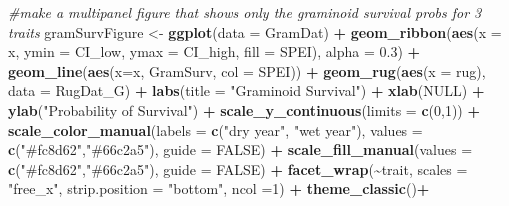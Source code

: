 \documentclass[
]{article}
\newenvironment{Shaded}{\begin{snugshade}}{\end{snugshade}}
\newcommand{\CommentTok}[1]{\textcolor[rgb]{0.56,0.35,0.01}{\textit{#1}}}
\newcommand{\DataTypeTok}[1]{\textcolor[rgb]{0.13,0.29,0.53}{#1}}
\newcommand{\DecValTok}[1]{\textcolor[rgb]{0.00,0.00,0.81}{#1}}
\newcommand{\FloatTok}[1]{\textcolor[rgb]{0.00,0.00,0.81}{#1}}
\newcommand{\KeywordTok}[1]{\textcolor[rgb]{0.13,0.29,0.53}{\textbf{#1}}}
\newcommand{\NormalTok}[1]{#1}
\newcommand{\OperatorTok}[1]{\textcolor[rgb]{0.81,0.36,0.00}{\textbf{#1}}}
\newcommand{\OtherTok}[1]{\textcolor[rgb]{0.56,0.35,0.01}{#1}}
\newcommand{\StringTok}[1]{\textcolor[rgb]{0.31,0.60,0.02}{#1}}
\begin{document}
\begin{Shaded}
\begin{Highlighting}[]
\CommentTok{\#make a multipanel figure that shows only the graminoid survival probs for 3 traits}
\NormalTok{gramSurvFigure \textless{}{-}}\StringTok{ }\KeywordTok{ggplot}\NormalTok{(}\DataTypeTok{data =}\NormalTok{ GramDat) }\OperatorTok{+}
\StringTok{  }\KeywordTok{geom\_ribbon}\NormalTok{(}\KeywordTok{aes}\NormalTok{(}\DataTypeTok{x =}\NormalTok{ x, }\DataTypeTok{ymin =}\NormalTok{ CI\_low, }\DataTypeTok{ymax =}\NormalTok{ CI\_high, }\DataTypeTok{fill =}\NormalTok{ SPEI), }\DataTypeTok{alpha =} \FloatTok{0.3}\NormalTok{) }\OperatorTok{+}
\StringTok{  }\KeywordTok{geom\_line}\NormalTok{(}\KeywordTok{aes}\NormalTok{(}\DataTypeTok{x=}\NormalTok{x, GramSurv, }\DataTypeTok{col =}\NormalTok{ SPEI))  }\OperatorTok{+}\StringTok{ }
\StringTok{  }\KeywordTok{geom\_rug}\NormalTok{(}\KeywordTok{aes}\NormalTok{(}\DataTypeTok{x =}\NormalTok{ rug), }\DataTypeTok{data =}\NormalTok{ RugDat\_G) }\OperatorTok{+}
\StringTok{  }\KeywordTok{labs}\NormalTok{(}\DataTypeTok{title =} \StringTok{"Graminoid Survival"}\NormalTok{) }\OperatorTok{+}
\StringTok{  }\KeywordTok{xlab}\NormalTok{(}\OtherTok{NULL}\NormalTok{) }\OperatorTok{+}
\StringTok{  }\KeywordTok{ylab}\NormalTok{(}\StringTok{"Probability of Survival"}\NormalTok{) }\OperatorTok{+}
\StringTok{  }\KeywordTok{scale\_y\_continuous}\NormalTok{(}\DataTypeTok{limits =} \KeywordTok{c}\NormalTok{(}\DecValTok{0}\NormalTok{,}\DecValTok{1}\NormalTok{)) }\OperatorTok{+}
\StringTok{  }\KeywordTok{scale\_color\_manual}\NormalTok{(}\DataTypeTok{labels =} \KeywordTok{c}\NormalTok{(}\StringTok{"dry year"}\NormalTok{, }\StringTok{"wet year"}\NormalTok{), }\DataTypeTok{values =} \KeywordTok{c}\NormalTok{(}\StringTok{"\#fc8d62"}\NormalTok{,}\StringTok{"\#66c2a5"}\NormalTok{), }\DataTypeTok{guide =} \OtherTok{FALSE}\NormalTok{) }\OperatorTok{+}
\StringTok{  }\KeywordTok{scale\_fill\_manual}\NormalTok{(}\DataTypeTok{values =} \KeywordTok{c}\NormalTok{(}\StringTok{"\#fc8d62"}\NormalTok{,}\StringTok{"\#66c2a5"}\NormalTok{), }\DataTypeTok{guide =} \OtherTok{FALSE}\NormalTok{) }\OperatorTok{+}
\StringTok{  }\KeywordTok{facet\_wrap}\NormalTok{(}\OperatorTok{\textasciitilde{}}\NormalTok{trait, }\DataTypeTok{scales =} \StringTok{"free\_x"}\NormalTok{, }\DataTypeTok{strip.position =}  \StringTok{"bottom"}\NormalTok{, }\DataTypeTok{ncol =}\DecValTok{1}\NormalTok{) }\OperatorTok{+}
\StringTok{  }\KeywordTok{theme\_classic}\NormalTok{()}\OperatorTok{+}

\end{Highlighting}
\end{Shaded}
\end{document}
